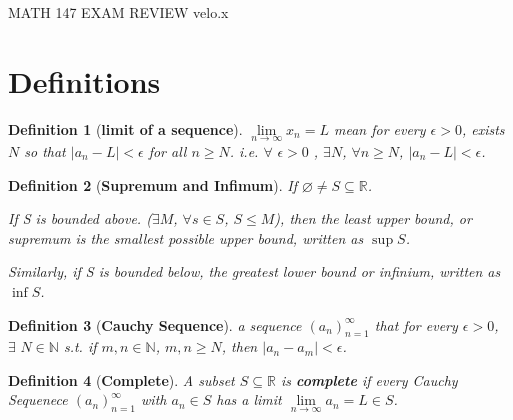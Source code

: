 \documentclass[12pt]{article}
\newcommand{\abs}[1]{\left| #1 \right|}
\theoremstyle{plain}
\newtheorem{definition}{Definition}[section]
\newcommand{\dlim}{\displaystyle\lim\limits}
\let\emptyset\varnothing
\begin{document}
MATH 147 EXAM REVIEW
velo.x

\section{Definitions}
	\begin{definition}[\textbf{limit of a sequence}]
		$\dlim_{n\to\infty} x_n=L$ mean for every $\epsilon >0$, 
		exists $N$ so that $\abs{a_n-L} < \epsilon$ for all $n\geq N$.
		i.e.  $\forall\,\, \epsilon > 0$ , $\exists N$, 
		$\forall n\geq N$, $\abs{a_n-L} < \epsilon$.\\
	\end{definition}
	
  \begin{definition}[\textbf{Supremum and Infimum}]
  	If $\emptyset \neq S \subseteq \mathbb{R}$. 
        
		If S is bounded above. ($\exists M$, $\forall s \in S$, $S \leq M$),
		then the least upper bound, or supremum
		is the smallest possible upper bound, written as \textbf{$\sup S$}. 

		Similarly, if S is bounded below, the greatest lower bound or infinium, 
		written as \textbf{$\inf S$}.\\
  \end{definition}

	\begin{definition}[\textbf{Cauchy Sequence}]
		a sequence $(a_n)_{n=1}^\infty$ that for every $\epsilon > 0$, 
		$\exists \,\, N\in\mathbb{N}$ s.t. if $m,n\in\mathbb{N}$, $m, n \geq N$, 
		then $\abs{a_n - a_m} < \epsilon$.\\
	\end{definition}

	\begin{definition}[\textbf{Complete}] 
		A subset $S\subseteq \mathbb{R}$ is \textbf{complete} if every
		Cauchy Sequenece $(a_n)_{n=1}^\infty$ with $a_n\in S$ has a limit 
		$\dlim_{n\to\infty} a_n=L \in S$. \\
	\end{definition}
\end{document}
